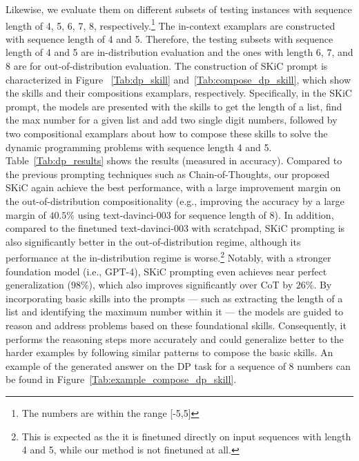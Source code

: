 Likewise, we evaluate them on different subsets of testing instances with sequence length of 4, 5, 6, 7, 8, respectively.\footnote{The numbers are within the range [-5,5]} The in-context examplars are constructed with sequence length of 4 and 5. Therefore, the testing subsets with sequence length of 4 and 5 are in-distribution evaluation and the ones with length 6, 7, and 8 are for out-of-distribution evaluation. The construction of SKiC prompt is characterized in Figure ~\ref{Tab:dp_skill} and~\ref{Tab:compose_dp_skill}, which show the skills and their compositions examplars, respectively. Specifically, in the SKiC prompt, the models are presented with the skills to get the length of a list, find the max number for a given list and add two single digit numbers, followed by two compositional examplars about how to compose these skills to solve the dynamic programming problems with sequence length 4 and 5. Table~\ref{Tab:dp_results} shows the results (measured in accuracy). Compared to the previous prompting techniques such as Chain-of-Thoughts, our proposed SKiC again achieve the best performance, with a large improvement margin on the out-of-distribution compositionality (e.g., improving the accuracy by a large margin of $40.5\%$ using text-davinci-003 for sequence length of $8$). In addition, compared to the finetuned text-davinci-003 with scratchpad, SKiC prompting is also significantly better in the out-of-distribution regime, although its performance at the in-distribution regime is worse.\footnote{This is expected as the it is finetuned directly on input sequences with length 4 and 5, while our method is not finetuned at all.} Notably, with a stronger foundation model (i.e., GPT-4), SKiC prompting even achieves near perfect generalization ($98\%$), which also improves significantly over CoT by $26\%$. By incorporating basic skills into the prompts --- such as extracting the length of a list and identifying the maximum number within it --- the models are guided to reason and address problems based on these foundational skills. Consequently, it performs the reasoning steps more accurately and could generalize better to the harder examples by following similar patterns to compose the basic skills. An example of the generated answer on the DP task for a sequence of 8 numbers can be found in Figure~\ref{Tab:example_compose_dp_skill}.



























